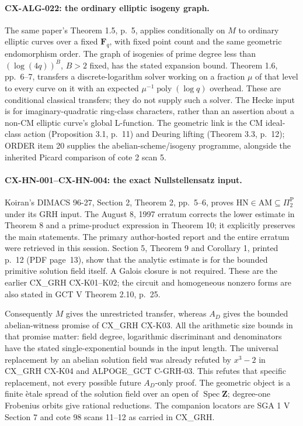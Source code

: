 \paragraph{CX-ALG-022: the ordinary elliptic isogeny graph.}
The same paper's Theorem 1.5, p.~5, applies conditionally on $M$ to ordinary
elliptic curves over a fixed $\mathbf F_q$, with fixed point count and
the same geometric endomorphism order. The graph of isogenies of prime
degree less than $(\log(4q))^B$, $B>2$ fixed, has the stated expansion
bound. Theorem 1.6, pp.~6--7, transfers a discrete-logarithm solver working
on a fraction $\mu$ of that level to every curve on it with an expected
$\mu^{-1}\operatorname{poly}(\log q)$ overhead. These are conditional
classical transfers; they do not supply such a solver. The Hecke input is
for imaginary-quadratic ring-class characters, rather than an assertion
about a non-CM elliptic curve's global L-function. The geometric link is
the CM ideal-class action (Proposition 3.1, p.~11) and Deuring lifting
(Theorem 3.3, p.~12); ORDER item 20 supplies the abelian-scheme/isogeny
programme, alongside the inherited Picard comparison of cote 2 scan 5.

\paragraph{CX-HN-001--CX-HN-004: the exact Nullstellensatz input.}
Koiran's DIMACS 96-27, Section 2, Theorem 2, pp.~5--6, proves
$\mathrm{HN}\in\mathrm{AM}\subseteq\Pi_2^{\mathrm P}$ under its GRH input.
The August 8, 1997 erratum corrects the lower estimate in Theorem 8 and a
prime-product expression in Theorem 10; it explicitly preserves the main
statements. The primary author-hosted report and the entire erratum were
retrieved in this session. Section 5, Theorem 9 and Corollary 1, printed p.~12 (PDF page~13),
show that the analytic estimate is for the bounded primitive solution
field itself. A Galois closure is not required. These are the earlier
CX\_GRH CX-K01--K02; the circuit and homogeneous nonzero forms are also
stated in GCT V Theorem 2.10, p.~25.

Consequently $M$ gives the unrestricted transfer, whereas $A_D$ gives the
bounded abelian-witness promise of CX\_GRH CX-K03. All the arithmetic size
bounds in that promise matter: field degree, logarithmic discriminant and
denominators have the stated single-exponential bounds in the input length.
The universal replacement by an abelian solution field was already refuted
by $x^3-2$ in CX\_GRH CX-K04 and ALPOGE\_GCT C-GRH-03. This refutes that
specific replacement, not every possible future $A_D$-only proof.
The geometric object is a finite \`etale spread of the solution field over
an open of $\operatorname{Spec}\mathbf Z$; degree-one Frobenius orbits give
rational reductions. The companion locators are SGA 1 V Section 7 and
cote 98 scans 11--12 as carried in CX\_GRH.

